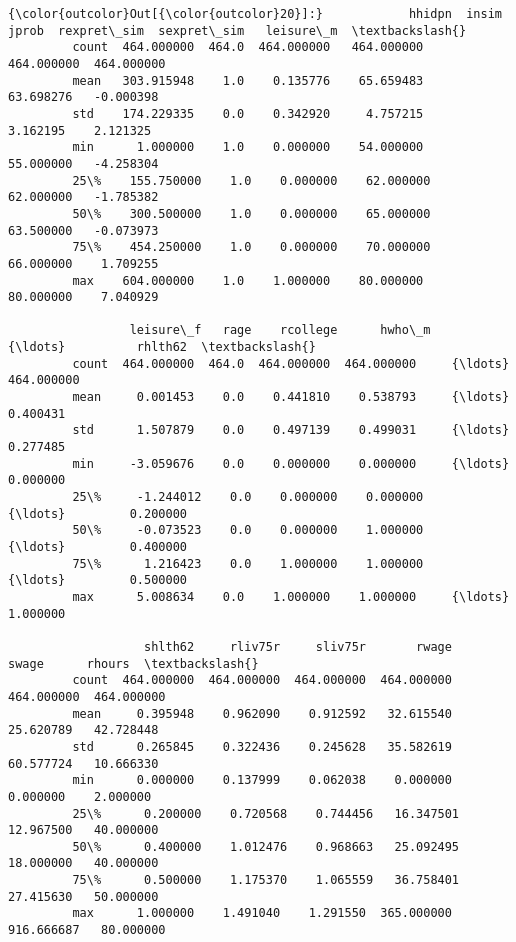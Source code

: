 \documentclass[11pt]{article}
\begin{document}
\begin{Verbatim}[commandchars=\\\{\}]
{\color{outcolor}Out[{\color{outcolor}20}]:}            hhidpn  insim       jprob  rexpret\_sim  sexpret\_sim   leisure\_m  \textbackslash{}
         count  464.000000  464.0  464.000000   464.000000   464.000000  464.000000   
         mean   303.915948    1.0    0.135776    65.659483    63.698276   -0.000398   
         std    174.229335    0.0    0.342920     4.757215     3.162195    2.121325   
         min      1.000000    1.0    0.000000    54.000000    55.000000   -4.258304   
         25\%    155.750000    1.0    0.000000    62.000000    62.000000   -1.785382   
         50\%    300.500000    1.0    0.000000    65.000000    63.500000   -0.073973   
         75\%    454.250000    1.0    0.000000    70.000000    66.000000    1.709255   
         max    604.000000    1.0    1.000000    80.000000    80.000000    7.040929   
         
                 leisure\_f   rage    rcollege      hwho\_m     {\ldots}          rhlth62  \textbackslash{}
         count  464.000000  464.0  464.000000  464.000000     {\ldots}       464.000000   
         mean     0.001453    0.0    0.441810    0.538793     {\ldots}         0.400431   
         std      1.507879    0.0    0.497139    0.499031     {\ldots}         0.277485   
         min     -3.059676    0.0    0.000000    0.000000     {\ldots}         0.000000   
         25\%     -1.244012    0.0    0.000000    0.000000     {\ldots}         0.200000   
         50\%     -0.073523    0.0    0.000000    1.000000     {\ldots}         0.400000   
         75\%      1.216423    0.0    1.000000    1.000000     {\ldots}         0.500000   
         max      5.008634    0.0    1.000000    1.000000     {\ldots}         1.000000   
         
                   shlth62     rliv75r     sliv75r       rwage       swage      rhours  \textbackslash{}
         count  464.000000  464.000000  464.000000  464.000000  464.000000  464.000000   
         mean     0.395948    0.962090    0.912592   32.615540   25.620789   42.728448   
         std      0.265845    0.322436    0.245628   35.582619   60.577724   10.666330   
         min      0.000000    0.137999    0.062038    0.000000    0.000000    2.000000   
         25\%      0.200000    0.720568    0.744456   16.347501   12.967500   40.000000   
         50\%      0.400000    1.012476    0.968663   25.092495   18.000000   40.000000   
         75\%      0.500000    1.175370    1.065559   36.758401   27.415630   50.000000   
         max      1.000000    1.491040    1.291550  365.000000  916.666687   80.000000   
         

\end{Verbatim}
\end{document}
